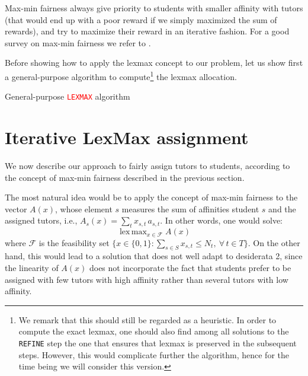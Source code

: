 \documentclass[11pt,oneside,a4paper]{article}     %
\DeclareMathOperator*{\lexmax}{lex\,max}
\begin{document}
Max-min fairness always give priority to students with smaller affinity with tutors (that would end up with a poor reward if we simply maximized the sum of rewards), and try to maximize their reward in an iterative fashion. For a good survey on max-min fairness we refer to \cite{nace2008max}.

Before showing how to apply the lexmax concept to our problem, let us show first a general-purpose algorithm to compute\footnote{We remark that this should still be regarded as a heuristic. In order to compute the exact lexmax, one should also find among all solutions to the \texttt{REFINE} step the one that ensures that lexmax is preserved in the subsequent steps. However, this would complicate further the algorithm, hence for the time being we will consider this version.} the lexmax allocation.

\begin{algorithm}[H]
\caption{General-purpose \textcolor{red}{\texttt{LEXMAX}} algorithm}
\label{alg:lexmax-genpurp}
\end{algorithm}





\section{Iterative LexMax assignment}

We now describe our approach to fairly assign tutors to students, according to the concept of max-min fairness described in the previous section.

The most natural idea would be to apply the concept of max-min fairness to the vector $A(x)$, whose element $s$ measures the sum of affinities student $s$ and the assigned tutors, i.e., $A_s(x)=\sum_{t}x_{s,t}\, a_{s,t}$. In other words, one would solve:
\[
\lexmax_{x\in \mathcal F} A(x)
\]
where $\mathcal F$ is the feasibility set $\{x\in\{0,1\}:\sum_{s\in S} x_{s,t}\le N_t, \ \forall\, t\in T\}$.
On the other hand, this would lead to a solution that does not well adapt to desiderata 2, since the linearity of $A(x)$ does not incorporate the fact that students prefer to be assigned with few tutors with high affinity rather than several tutors with low affinity.
\end{document}
